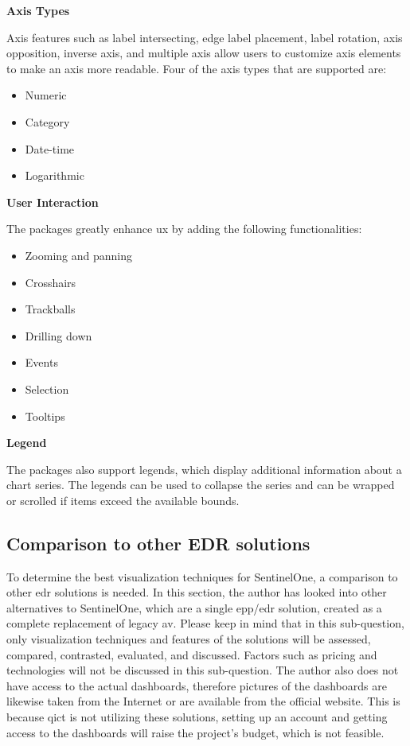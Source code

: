 \textbf{Axis Types}

Axis features such as label intersecting, edge label placement, label rotation, axis opposition, inverse
axis, and multiple axis allow users to customize axis elements to make an axis more readable. Four of the
axis types that are supported are:
\begin{itemize}
      \item Numeric
      \item Category
      \item Date-time
      \item Logarithmic
\end{itemize}

\textbf{User Interaction}

The packages greatly enhance \acrshort{ux} by adding the following functionalities:
\begin{itemize}
      \item Zooming and panning
      \item Crosshairs
      \item Trackballs
      \item Drilling down
      \item Events
      \item Selection
      \item Tooltips
\end{itemize}

\textbf{Legend}

The packages also support legends, which display additional information about a chart series. The legends
can be used to collapse the series and can be wrapped or scrolled if items exceed the available bounds.

\subsection{Comparison to other EDR solutions}
To determine the best visualization techniques for SentinelOne, a comparison to other \acrshort{edr}
solutions is needed. In this section, the author has looked into other alternatives to SentinelOne, which are
a single \acrshort{epp}/\acrshort{edr} solution, created as a complete replacement of legacy \acrshort{av}.
Please keep in mind that in this sub-question, only visualization techniques and features of the solutions
will be assessed, compared, contrasted, evaluated, and discussed. Factors such as pricing and technologies
will not be discussed in this sub-question. The author also does not have access to the actual dashboards,
therefore pictures of the dashboards are likewise taken from the Internet or are available from the official
website. This is because \acrshort{qict} is not utilizing these solutions, setting up an account and getting
access to the dashboards will raise the project's budget, which is not feasible.

